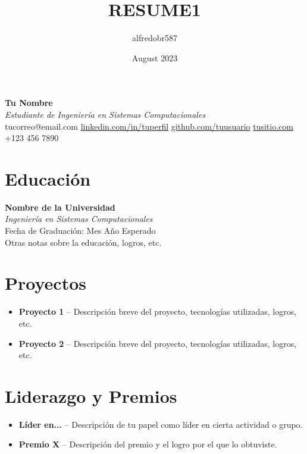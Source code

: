 \documentclass[a4paper,10pt]{article}
\title{RESUME1}
\author{alfredobr587 }
\date{August 2023}
\makeatletter
\newcommand{\fullname}{Tu Nombre}
\newcommand{\email}{tucorreo@email.com}
\newcommand{\linkedin}{\href{https://www.linkedin.com/in/tuperfil}{linkedin.com/in/tuperfil}}
\newcommand{\github}{\href{https://github.com/tuusuario}{github.com/tuusuario}}
\newcommand{\website}{\href{https://www.tusitio.com}{tusitio.com}}
\newcommand{\phone}{+123 456 7890}
\newenvironment{tightitemize}{
\begin{itemize}[noitemsep,topsep=0pt]
}{\end{itemize}}
\makeatother
\begin{document}
\pagestyle{empty} %

\begin{center}
    {\Huge \textbf{\fullname}} \\
    \vspace{5pt}
    {\small \textit{Estudiante de Ingeniería en Sistemas Computacionales}} \\
    \vspace{5pt}
    \faEnvelope \hspace{2pt} \email \hspace{10pt}
    \faLinkedin \hspace{2pt} \linkedin \hspace{10pt}
    \faGithub \hspace{2pt} \github \hspace{10pt}
    \faGlobe \hspace{2pt} \website \hspace{10pt}
    \faPhone \hspace{2pt} \phone
\end{center}

\section*{Educación}
\textbf{Nombre de la Universidad} \\
\textit{Ingeniería en Sistemas Computacionales} \\
Fecha de Graduación: Mes Año Esperado \\
Otras notas sobre la educación, logros, etc.

\section*{Proyectos}
\begin{tightitemize}
    \item \textbf{Proyecto 1} -- Descripción breve del proyecto, tecnologías utilizadas, logros, etc.
    \item \textbf{Proyecto 2} -- Descripción breve del proyecto, tecnologías utilizadas, logros, etc.
\end{tightitemize}

\section*{Liderazgo y Premios}
\begin{tightitemize}
    \item \textbf{Líder en...} -- Descripción de tu papel como líder en cierta actividad o grupo.
    \item \textbf{Premio X} -- Descripción del premio y el logro por el que lo obtuviste.
\end{tightitemize}
\end{document}
